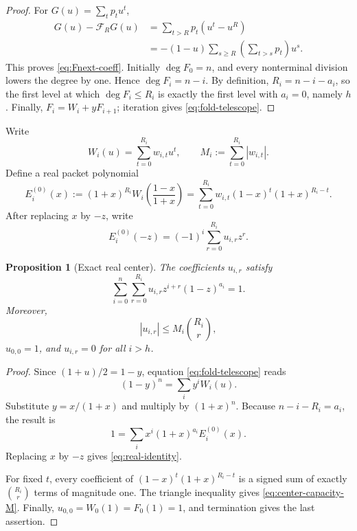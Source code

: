 \documentclass[11pt]{article}
\newtheorem{proposition}[theorem]{Proposition}
\theoremstyle{definition}
\theoremstyle{remark}
\begin{document}
\begin{proof}
For $G(u)=\sum_tp_tu^t$,
\begin{align*}
 G(u)-\mathcal F_RG(u)
 &=\sum_{t>R}p_t(u^t-u^R)\\
 &=-(1-u)\sum_{s\ge R}
      \left(\sum_{t>s}p_t\right)u^s.
\end{align*}
This proves \eqref{eq:Fnext-coeff}.  Initially $\deg F_0=n$, and every nonterminal division lowers the degree by one.  Hence $\deg F_i=n-i$.  By definition, $R_i=n-i-a_i$, so the first level at which $\deg F_i\le R_i$ is exactly the first level with $a_i=0$, namely $h$.  Finally, $F_i=W_i+yF_{i+1}$; iteration gives \eqref{eq:fold-telescope}.
\end{proof}

Write
\[
 W_i(u)=\sum_{t=0}^{R_i}w_{i,t}u^t,
 \qquad
 M_i:=\sum_{t=0}^{R_i}|w_{i,t}|.
\]
Define a real packet polynomial
\begin{equation}\label{eq:real-E}
 E_i^{(0)}(x)
 :=(1+x)^{R_i}W_i\!\left(\frac{1-x}{1+x}\right)
 =\sum_{t=0}^{R_i}w_{i,t}(1-x)^t(1+x)^{R_i-t}.
\end{equation}
After replacing $x$ by $-z$, write
\[
 E_i^{(0)}(-z)=(-1)^i\sum_{r=0}^{R_i}u_{i,r}z^r.
\]

\begin{proposition}[Exact real center]\label{prop:real-center}
The coefficients $u_{i,r}$ satisfy
\begin{equation}\label{eq:real-identity}
 \sum_{i=0}^{n}\sum_{r=0}^{R_i}
 u_{i,r}z^{i+r}(1-z)^{a_i}=1.
\end{equation}
Moreover,
\begin{equation}\label{eq:center-capacity-M}
 |u_{i,r}|\le M_i\binom{R_i}{r},
\end{equation}
$u_{0,0}=1$, and $u_{i,r}=0$ for all $i>h$.
\end{proposition}

\begin{proof}
Since $(1+u)/2=1-y$, equation \eqref{eq:fold-telescope} reads
\[
 (1-y)^n=\sum_i y^iW_i(u).
\]
Substitute $y=x/(1+x)$ and multiply by $(1+x)^n$.  Because $n-i-R_i=a_i$, the result is
\[
 1=\sum_i x^i(1+x)^{a_i}E_i^{(0)}(x).
\]
Replacing $x$ by $-z$ gives \eqref{eq:real-identity}.

For fixed $t$, every coefficient of $(1-x)^t(1+x)^{R_i-t}$ is a signed sum of exactly $\binom{R_i}{r}$ terms of magnitude one.  The triangle inequality gives \eqref{eq:center-capacity-M}.  Finally, $u_{0,0}=W_0(1)=F_0(1)=1$, and termination gives the last assertion.
\end{proof}
\end{document}
